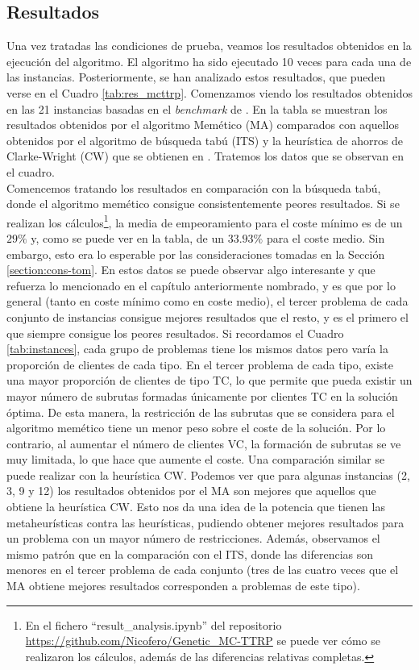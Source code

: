 \subsection{Resultados}
Una vez tratadas las condiciones de prueba, veamos los resultados obtenidos en la ejecución del algoritmo. El algoritmo ha sido ejecutado 10 veces para cada una de las instancias. Posteriormente, se han analizado estos resultados, que pueden verse en el Cuadro \ref{tab:res_mcttrp}. Comenzamos viendo los resultados obtenidos en las 21 instancias basadas en el \textit{benchmark} de \cite{Christofides1976}. En la tabla se muestran los resultados obtenidos por el algoritmo Memético (MA) comparados con aquellos obtenidos por el algoritmo de búsqueda tabú (ITS) y la heurística de ahorros de Clarke-Wright (CW) que se obtienen en \cite{laura-mcttrp}. Tratemos los datos que se observan en el cuadro.\\

Comencemos tratando los resultados en comparación con la búsqueda tabú, donde el algoritmo memético consigue consistentemente peores resultados. Si se realizan los cálculos\footnote{En el fichero ``result\_analysis.ipynb'' del repositorio \url{https://github.com/Nicofero/Genetic_MC-TTRP} se puede ver cómo se realizaron los cálculos, además de las diferencias relativas completas.}, la media de empeoramiento para el coste mínimo es de un $29\%$ y, como se puede ver en la tabla, de un $33.93\%$ para el coste medio. Sin embargo, esto era lo esperable por las consideraciones tomadas en la Sección \ref{section:cons-tom}. En estos datos se puede observar algo interesante y que refuerza lo mencionado en el capítulo anteriormente nombrado, y es que por lo general (tanto en coste mínimo como en coste medio), el tercer problema de cada conjunto de instancias consigue mejores resultados que el resto, y es el primero el que siempre consigue los peores resultados. Si recordamos el Cuadro \ref{tab:instances}, cada grupo de problemas tiene los mismos datos pero varía la proporción de clientes de cada tipo. En el tercer problema de cada tipo, existe una mayor proporción de clientes de tipo TC, lo que permite que pueda existir un mayor número de subrutas formadas únicamente por clientes TC en la solución óptima. De esta manera, la restricción de las subrutas que se considera para el algoritmo memético tiene un menor peso sobre el coste de la solución. Por lo contrario, al aumentar el número de clientes VC, la formación de subrutas se ve muy limitada, lo que hace que aumente el coste. Una comparación similar se puede realizar con la heurística CW. Podemos ver que para algunas instancias (2, 3, 9 y 12) los resultados obtenidos por el MA son mejores que aquellos que obtiene la heurística CW. Esto nos da una idea de la potencia que tienen las metaheurísticas contra las heurísticas, pudiendo obtener mejores resultados para un problema con un mayor número de restricciones. Además, observamos el mismo patrón que en la comparación con el ITS, donde las diferencias son menores en el tercer problema de cada conjunto (tres de las cuatro veces que el MA obtiene mejores resultados corresponden a problemas de este tipo). \\

